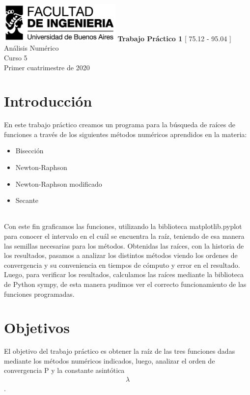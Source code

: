 \documentclass[titlepage,a4paper]{article}
\begin{document}
\begin{titlepage} %
	\hfill\includegraphics[width=6cm]{logofiuba.jpg}
    \centering
    \vfill
    \Huge \textbf{Trabajo Práctico 1}
    \vskip2cm
    \Large [ 75.12 - 95.04 ] Análisis Numérico\\
    Curso 5 \\ 
    Primer cuatrimestre de 2020 
    \vfill
    \vfill
    \vfill
\end{titlepage}

\tableofcontents %

\section{Introducción}\label{sec:intro}
En este trabajo práctico creamos un programa para la búsqueda de raíces de funciones a través de los siguientes métodos numéricos aprendidos en la materia:
\begin{itemize}
\item Bisección
\item Newton-Raphson
\item Newton-Raphson modificado
\item Secante
\end{itemize}
\\Con este fin graficamos las funciones, utilizando la biblioteca matplotlib.pyplot para conocer el intervalo en el cuál se encuentra la raíz, teniendo de esa manera las semillas necesarias para los métodos. Obtenidas las raíces, con la historia de los resultados, pasamos a analizar los distintos métodos viendo los ordenes de convergencia y su conveniencia en tiempos de cómputo y error en el resultado.
Luego, para verificar los resultados, calculamos las raíces mediante la biblioteca de Python sympy, de esta manera pudimos ver el correcto funcionamiento de las funciones programadas.

\section{Objetivos}\label{sec:objetivos}
El objetivo del trabajo práctico es obtener la raíz de las tres funciones dadas mediante los métodos numéricos indicados, luego, analizar el orden de convergencia P y la constante asintótica \begin{align}
\lambda
\end{align}. 
\end{document}
